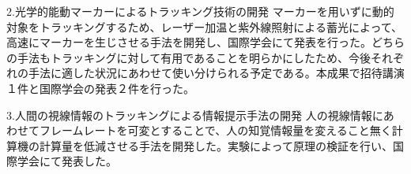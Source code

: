  2.光学的能動マーカーによるトラッキング技術の開発
マーカーを用いずに動的対象をトラッキングするため、レーザー加温と紫外線照射による蓄光によって、高速にマーカーを生じさせる手法を開発し、国際学会にて発表を行った。どちらの手法もトラッキングに対して有用であることを明らかにしたため、今後それぞれの手法に適した状況にあわせて使い分けられる予定である。本成果で招待講演１件と国際学会の発表２件を行った。

 3.人間の視線情報のトラッキングによる情報提示手法の開発
人の視線情報にあわせてフレームレートを可変とすることで、人の知覚情報量を変えること無く計算機の計算量を低減させる手法を開発した。実験によって原理の検証を行い、国際学会にて発表した。

